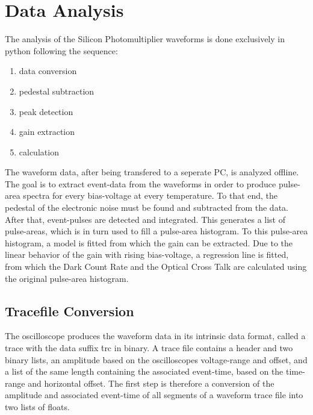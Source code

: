 \documentclass[12pt,article,type=msc,colorback,accentcolor=tud9c]{tudthesis}
\begin{document}
\section{\Large Data Analysis}
The analysis of the Silicon Photomultiplier waveforms is done exclusively in python following the sequence:\\
\begin{enumerate}[topsep=0pt,itemsep=-1ex,partopsep=1ex,parsep=1ex]
\item data conversion
\item pedestal subtraction
\item peak detection
\item gain extraction
\item calculation
\end{enumerate}
The waveform data, after being transfered to a seperate PC, is analyzed offline. The goal is to extract event-data from the waveforms in order to produce pulse-area spectra for every bias-voltage at every temperature. To that end, the pedestal of the electronic noise must be found and subtracted from the data. After that, event-pulses are detected and integrated. This generates a list of pulse-areas, which is in turn used to fill a pulse-area histogram. To this pulse-area histogram, a model is fitted from which the gain can be extracted. Due to the linear behavior of the gain with rising bias-voltage, a regression line is fitted, from which the Dark Count Rate and the Optical Cross Talk are calculated using the original pulse-area histogram.
\subsection{Tracefile Conversion}
The oscilloscope produces the waveform data in its intrinsic data format, called a trace with the data suffix \.trc in binary. A trace file contains a header and two binary lists, an amplitude based on the oscilloscopes voltage-range and offset, and a list of the same length containing the associated event-time, based on the time-range and horizontal offset. The first step is therefore a conversion of the amplitude and associated event-time of all segments of a waveform trace file into two lists of floats. 
\clearpage
\end{document}
